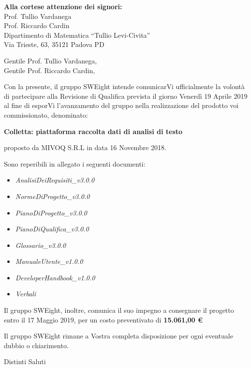 \documentclass[11pt]{brownletter}
\date{Padova, 12 Aprile 2019} %
\newcommand{\AdR}{\emph{AnalisiDeiRequisiti\_v3.0.0}}
\newcommand{\NdP}{\emph{NormeDiProgetto\_v3.0.0}}
\newcommand{\PdP}{\emph{PianoDiProgetto\_v3.0.0}}
\newcommand{\PdQ}{\emph{PianoDiQualifica\_v3.0.0}}
\newcommand{\G}{\emph{Glossario\_v3.0.0}}
\newcommand{\MU}{\emph{ManualeUtente\_v1.0.0}}
\newcommand{\MS}{\emph{DeveloperHandbook\_v1.0.0}}
\begin{document}
\begin{letter}{\textbf{Alla cortese attenzione dei signori:}\\
	Prof. Tullio Vardanega\\
	Prof. Riccardo Cardin\\
	Dipartimento di Matematica “Tullio Levi-Civita”\\
	Via Trieste, 63, 35121 Padova PD}

\opening{	Gentile Prof. Tullio Vardanega,\\
			Gentile Prof. Riccardo Cardin,\\}

Con la presente, il gruppo SWEight intende comunicarVi ufficialmente la volontà di partecipare  alla Revisione di Qualifica prevista il giorno Venerdì 19 Aprile 2019 al fine di esporVi l’avanzamento del gruppo nella realizzazione del prodotto voi commissionato, denominato:
\begin{center}
	\textbf{Colletta: piattaforma raccolta dati di analisi di testo}
\end{center}
proposto da MIVOQ S.R.L in data 16 Novembre 2018.

Sono reperibili in allegato i seguenti documenti:
\begin{itemize}
	\item \AdR
	\item \NdP
	\item \PdP
	\item \PdQ
	\item \G
	\item \MU
	\item \MS
	\item \emph{Verbali}
\end{itemize}
Il gruppo SWEight, inoltre, comunica il suo impegno a consegnare il progetto entro il 17 Maggio 2019, per un costo preventivato di \textbf{15.061,00 \euro}

Il gruppo SWEight rimane a Vostra completa disposizione per ogni eventuale dubbio o chiarimento.
\closing{Distinti Saluti}

\end{letter}
\end{document}
